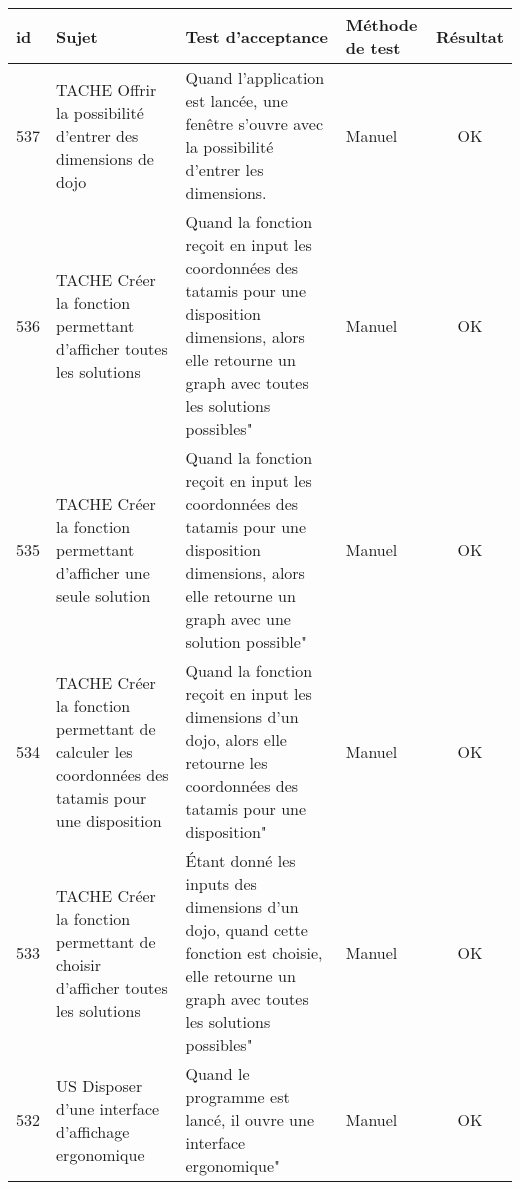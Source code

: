 \noindent%
\begin{adjustwidth}{-1.5cm}{0cm}

    \renewcommand{\arraystretch}{1.2}
    {\setlength{\tabcolsep}{1.5 mm}
        \begin{tabular}{|m{0.6cm}|m{5.5cm}|m{8cm}|m{2cm}|c|} \hline
            id                       & Sujet                                                                                           & Test d'acceptance                                                                                                                                                & Méthode de test & Résultat \\ \hline
            537                      & TACHE Offrir la possibilité d'entrer des dimensions de dojo                                     & Quand l'application est lancée, une fenêtre s'ouvre avec la possibilité d'entrer les dimensions.                                                                 & Manuel          & OK       \\ \hline
            536                      & TACHE Créer la fonction permettant d'afficher toutes les solutions                              & Quand la fonction reçoit en input les coordonnées des tatamis pour une disposition dimensions, alors elle retourne un graph avec toutes les solutions possibles" & Manuel          & OK       \\ \hline
            535                      & TACHE Créer la fonction permettant d'afficher une seule solution                                & Quand la fonction reçoit en input les coordonnées des tatamis pour une disposition dimensions, alors elle retourne un graph avec une solution possible"          & Manuel          & OK       \\ \hline
            534                      & TACHE Créer la fonction permettant de calculer les coordonnées des tatamis pour une disposition & Quand la fonction reçoit en input les dimensions d'un dojo, alors elle retourne les coordonnées des tatamis pour une disposition"                                & Manuel          & OK       \\ \hline
            533                      & TACHE Créer la fonction permettant de choisir d'afficher toutes les solutions                   & Étant donné les inputs des dimensions d'un dojo, quand cette fonction est choisie, elle retourne un graph avec toutes les solutions possibles"                   & Manuel          & OK       \\ \hline
            532                      & US Disposer d'une interface d'affichage ergonomique                                             & Quand le programme est lancé, il ouvre une interface ergonomique"                                                                                                & Manuel          & OK       \\ \hline

\end{tabular}}
\end{adjustwidth}
